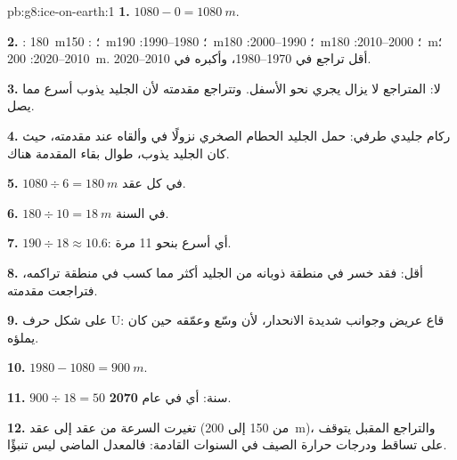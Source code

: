 \begin{solution}{pb:g8:ice-on-earth:1}
\textbf{1.} $1080 - 0 = \qty{1080}{m}$.

\textbf{2.} : \qty{180}{m}؛ : \qty{150}{m}؛
1980--1990: \qty{190}{m}؛ 1990--2000: \qty{180}{m}؛ 2000--2010:
\qty{180}{m}؛ 2010--2020: \qty{200}{m}. أقل تراجع في 1970--1980، وأكبره
في 2010--2020.

\textbf{3.} لا:  المتراجع لا يزال يجري نحو الأسفل. وتتراجع
مقدمته لأن الجليد يذوب أسرع مما يصل.

\textbf{4.} ركام جليدي طرفي: حمل الجليد الحطام الصخري نزولًا في 
وألقاه عند مقدمته، حيث كان الجليد يذوب، طوال بقاء المقدمة
هناك.

\textbf{5.} $1080 \div 6 = \qty{180}{m}$ في كل عقد.

\textbf{6.} $180 \div 10 = \qty{18}{m}$ في السنة.

\textbf{7.} $190 \div 18 \approx 10.6$: أي أسرع بنحو 11 مرة.

\textbf{8.} أقل: فقد خسر في منطقة ذوبانه من الجليد أكثر مما كسب في منطقة
تراكمه، فتراجعت مقدمته.

\textbf{9.} على شكل حرف U: قاع عريض وجوانب شديدة الانحدار، لأن  وسّع  وعمّقه حين كان يملؤه.

\textbf{10.} $1980 - 1080 = \qty{900}{m}$.

\textbf{11.} $900 \div 18 = 50$ سنة: أي في عام \textbf{2070}.

\textbf{12.} تغيرت السرعة من عقد إلى عقد (من 150 إلى \qty{200}{m})،
والتراجع المقبل يتوقف على تساقط  ودرجات حرارة الصيف في السنوات القادمة:
فالمعدل الماضي ليس تنبؤًا.
\end{solution}
